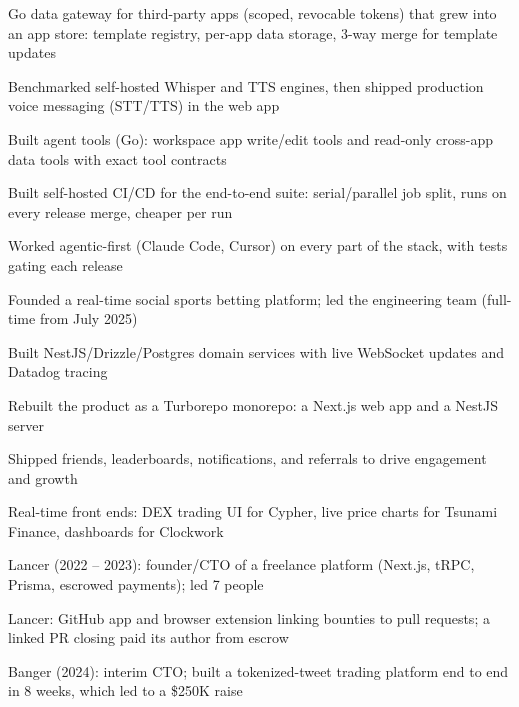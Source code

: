 \documentclass[print]{jack-resume}
\begin{document}
\begin{tightemize}
    \item Go data gateway for third-party apps (scoped, revocable tokens) that grew into an app store: template registry, per-app data storage, 3-way merge for template updates
    \item Benchmarked self-hosted Whisper and TTS engines, then shipped production voice messaging (STT/TTS) in the web app
    \item Built agent tools (Go): workspace app write/edit tools and read-only cross-app data tools with exact tool contracts
    \item Built self-hosted CI/CD for the end-to-end suite: serial/parallel job split, runs on every release merge, cheaper per run
    \item Worked agentic-first (Claude Code, Cursor) on every part of the stack, with tests gating each release
\end{tightemize}
\sectionsep

\begin{tightemize}
    \item Founded a real-time social sports betting platform; led the engineering team (full-time from July 2025)
    \item Built NestJS/Drizzle/Postgres domain services with live WebSocket updates and Datadog tracing
    \item Rebuilt the product as a Turborepo monorepo: a Next.js web app and a NestJS server
    \item Shipped friends, leaderboards, notifications, and referrals to drive engagement and growth
\end{tightemize}
\sectionsep

\begin{tightemize}
    \item Real-time front ends: DEX trading UI for Cypher, live price charts for Tsunami Finance, dashboards for Clockwork
    \item Lancer (2022 -- 2023): founder/CTO of a freelance platform (Next.js, tRPC, Prisma, escrowed payments); led 7 people
    \item Lancer: GitHub app and browser extension linking bounties to pull requests; a linked PR closing paid its author from escrow
    \item Banger (2024): interim CTO; built a tokenized-tweet trading platform end to end in 8 weeks, which led to a \$250K raise
\end{tightemize}
\sectionsep
\end{document}
